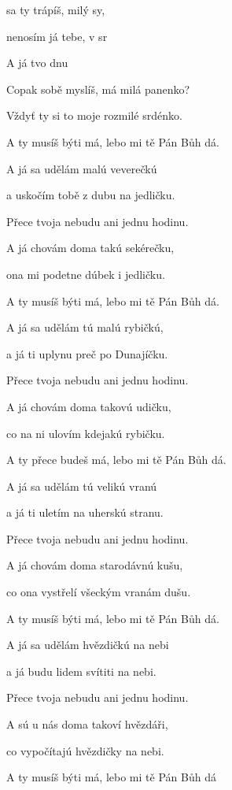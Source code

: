 

\zs
{} sa ty trápíš,  milý sy,

nenosím já tebe,  v sr

A já tvo 
dnu 
\ks

\zs
Copak sobě myslíš, má milá panenko?

Vždyť ty si to moje rozmilé srdénko.

A ty musíš býti má, lebo mi tě Pán Bůh dá.
\ks

\zs
A já sa udělám malú veverečkú

a uskočím tobě z dubu na jedličku.

Přece tvoja nebudu ani jednu hodinu.
\ks

\zs
A já chovám doma takú sekérečku,

ona mi podetne dúbek i jedličku.

A ty musíš býti má, lebo mi tě Pán Bůh dá.
\ks

\zs
A já sa udělám tú malú rybičkú,

a já ti uplynu preč po Dunajíčku.

Přece tvoja nebudu ani jednu hodinu.
\ks

\zs
A já chovám doma takovú udičku,

co na ni ulovím kdejakú rybičku.

A ty přece budeš má, lebo mi tě Pán Bůh dá.
\ks

\zr
{}     
\kr

\zs
A já sa udělám tú velikú vranú

a já ti uletím na uherskú stranu.

Přece tvoja nebudu ani jednu hodinu.
\ks

\zs
A já chovám doma starodávnú kušu,

co ona vystřelí všeckým vranám dušu.

A ty musíš býti má, lebo mi tě Pán Bůh dá.
\ks

\zs
A já sa udělám hvězdičkú na nebi

a já budu lidem svítiti na nebi.

Přece tvoja nebudu ani jednu hodinu.
\ks

\zs
A sú u nás doma takoví hvězdáři,

co vypočítajú hvězdičky na nebi.

A ty musíš býti má, lebo mi tě Pán Bůh dá
\ks

\zr
{}      ~~
     
\kr

\kp







